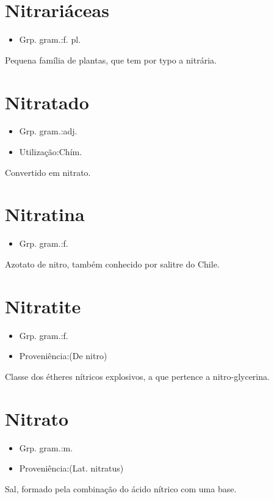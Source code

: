 \section{Nitrariáceas}
\begin{itemize}
\item {Grp. gram.:f. pl.}
\end{itemize}
Pequena família de plantas, que tem por typo a nitrária.
\section{Nitratado}
\begin{itemize}
\item {Grp. gram.:adj.}
\end{itemize}
\begin{itemize}
\item {Utilização:Chím.}
\end{itemize}
Convertido em nitrato.
\section{Nitratina}
\begin{itemize}
\item {Grp. gram.:f.}
\end{itemize}
Azotato de nitro, também conhecido por \textunderscore salitre do Chile\textunderscore .
\section{Nitratite}
\begin{itemize}
\item {Grp. gram.:f.}
\end{itemize}
\begin{itemize}
\item {Proveniência:(De \textunderscore nitro\textunderscore )}
\end{itemize}
Classe dos étheres nítricos explosivos, a que pertence a nitro-glycerina.
\section{Nitrato}
\begin{itemize}
\item {Grp. gram.:m.}
\end{itemize}
\begin{itemize}
\item {Proveniência:(Lat. \textunderscore nitratus\textunderscore )}
\end{itemize}
Sal, formado pela combinação do ácido nítrico com uma base.
